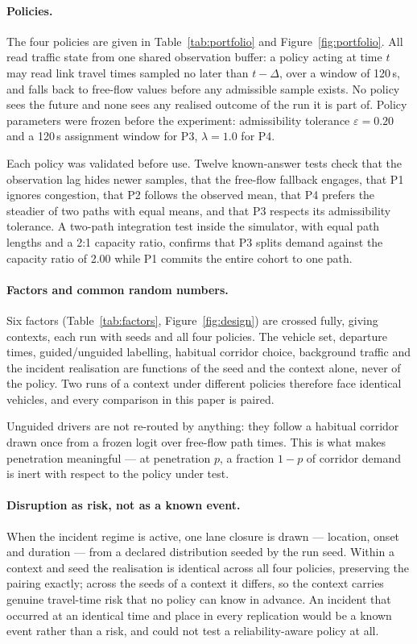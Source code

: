 \paragraph{Policies.} The four policies are given in
Table~\ref{tab:portfolio} and Figure~\ref{fig:portfolio}. All read traffic
state from one shared observation buffer: a policy acting at time $t$ may read
link travel times sampled no later than $t-\Delta$, over a window of 120\,s,
and falls back to free-flow values before any admissible sample exists. No
policy sees the future and none sees any realised outcome of the run it is part
of. Policy parameters were frozen before the experiment: admissibility
tolerance $\varepsilon=0.20$ and a 120\,s assignment window for P3,
$\lambda=1.0$ for P4.

Each policy was validated before use. Twelve known-answer tests check that the
observation lag hides newer samples, that the free-flow fallback engages, that
P1 ignores congestion, that P2 follows the observed mean, that P4 prefers the
steadier of two paths with equal means, and that P3 respects its admissibility
tolerance. A two-path integration test inside the simulator, with equal path
lengths and a 2:1 capacity ratio, confirms that P3 splits demand
\NumTwoPathRatio{} against the capacity ratio of 2.00 while P1 commits the
entire cohort to one path.

\paragraph{Factors and common random numbers.} Six factors
(Table~\ref{tab:factors}, Figure~\ref{fig:design}) are crossed fully, giving
\NumContexts{} contexts, each run with \NumSeeds{} seeds and all four policies.
The vehicle set, departure times, guided/unguided labelling, habitual corridor
choice, background traffic and the incident realisation are functions of the
seed and the context alone, never of the policy. Two runs of a context under
different policies therefore face identical vehicles, and every comparison in
this paper is paired.

Unguided drivers are not re-routed by anything: they follow a habitual corridor
drawn once from a frozen logit over free-flow path times. This is what makes
penetration meaningful --- at penetration $p$, a fraction $1-p$ of corridor
demand is inert with respect to the policy under test.

\paragraph{Disruption as risk, not as a known event.} When the incident regime
is active, one lane closure is drawn --- location, onset and duration --- from a
declared distribution seeded by the run seed. Within a context and seed the
realisation is identical across all four policies, preserving the pairing
exactly; across the seeds of a context it differs, so the context carries
genuine travel-time risk that no policy can know in advance. An incident that
occurred at an identical time and place in every replication would be a known
event rather than a risk, and could not test a reliability-aware policy at all.

